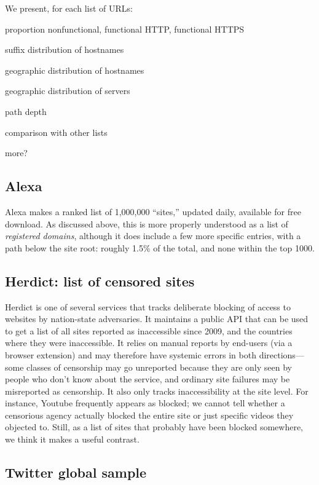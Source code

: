 \documentclass[tinymargin]{zarticle}
\begin{document}
We present, for each list of URLs:

proportion nonfunctional, functional HTTP, functional HTTPS

suffix distribution of hostnames

geographic distribution of hostnames

geographic distribution of servers

path depth

comparison with other lists

more?

\subsection{Alexa}

Alexa makes a ranked list of 1,000,000 “sites,” updated daily,
available for free download.  As discussed above, this is more
properly understood as a list of \emph{registered domains}, although
it does include a few more specific entries, with a path below the
site root: roughly 1.5\% of the total, and none within the top 1000.

\subsection{Herdict: list of censored sites}

Herdict is one of several services that tracks deliberate blocking of
access to websites by nation-state adversaries.  It maintains a public
API that can be used to get a list of all sites reported as
inaccessible since 2009, and the countries where they were
inaccessible.  It relies on manual reports by end-users (via a browser
extension) and may therefore have systemic errors in both
directions---some classes of censorship may go unreported because they
are only seen by people who don't know about the service, and ordinary
site failures may be misreported as censorship.  It also only tracks
inaccessibility at the site level.  For instance, Youtube frequently
appears as blocked; we cannot tell whether a censorious agency
actually blocked the entire site or just specific videos they objected
to. Still, as a list of sites that probably have been blocked
somewhere, we think it makes a useful contrast.

\subsection{Twitter global sample}
\end{document}
